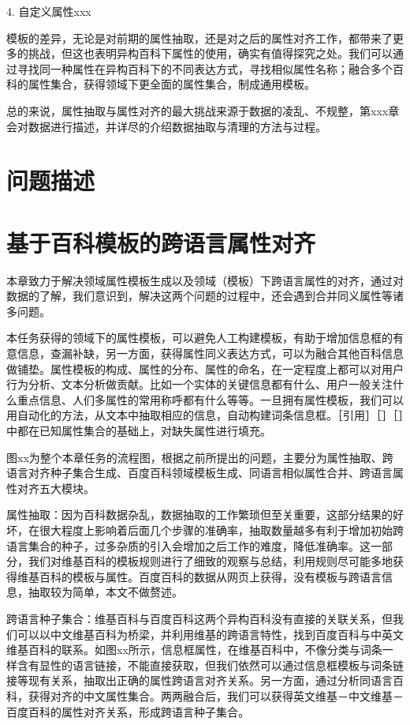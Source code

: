 4.  自定义属性xxx

模板的差异，无论是对前期的属性抽取，还是对之后的属性对齐工作，都带来了更多的挑战，但这也表明异构百科下属性的使用，确实有值得探究之处。我们可以通过寻找同一种属性在异构百科下的不同表达方式，寻找相似属性名称；融合多个百科的属性集合，获得领域下更全面的属性集合，制成通用模板。

总的来说，属性抽取与属性对齐的最大挑战来源于数据的凌乱、不规整，第xxx章会对数据进行描述，并详尽的介绍数据抽取与清理的方法与过程。

\section{问题描述}

\section{基于百科模板的跨语言属性对齐}
\label{sec:property-matching}

本章致力于解决领域属性模板生成以及领域（模板）下跨语言属性的对齐，通过对数据的了解，我们意识到，解决这两个问题的过程中，还会遇到合并同义属性等诸多问题。

本任务获得的领域下的属性模板，可以避免人工构建模板，有助于增加信息框的有意信息，查漏补缺，另一方面，获得属性同义表达方式，可以为融合其他百科信息做铺垫。属性模板的构成、属性的分布、属性的命名，在一定程度上都可以对用户行为分析、文本分析做贡献。比如一个实体的关键信息都有什么、用户一般关注什么重点信息、人们多属性的常用称呼都有什么等等。一旦拥有属性模板，我们可以用自动化的方法，从文本中抽取相应的信息，自动构建词条信息框。［引用］［］［］中都在已知属性集合的基础上，对缺失属性进行填充。

图xx为整个本章任务的流程图，根据之前所提出的问题，主要分为属性抽取、跨语言对齐种子集合生成、百度百科领域模板生成、同语言相似属性合并、跨语言属性对齐五大模块。

属性抽取：因为百科数据杂乱，数据抽取的工作繁琐但至关重要，这部分结果的好坏，在很大程度上影响着后面几个步骤的准确率，抽取数量越多有利于增加初始跨语言集合的种子，过多杂质的引入会增加之后工作的难度，降低准确率。这一部分，我们对维基百科的模板规则进行了细致的观察与总结，利用规则尽可能多地获得维基百科的模板与属性。百度百科的数据从网页上获得，没有模板与跨语言信息，抽取较为简单，本文不做赘述。

跨语言种子集合：维基百科与百度百科这两个异构百科没有直接的关联关系，但我们可以以中文维基百科为桥梁，并利用维基的跨语言特性，找到百度百科与中英文维基百科的联系。如图xx所示，信息框属性，在维基百科中，不像分类与词条一样含有显性的语言链接，不能直接获取，但我们依然可以通过信息框模板与词条链接等现有关系，抽取出正确的属性跨语言对齐关系。另一方面，通过分析同语言百科，获得对齐的中文属性集合。两两融合后，我们可以获得英文维基－中文维基－百度百科的属性对齐关系，形成跨语言种子集合。

